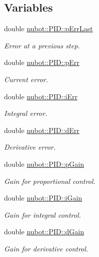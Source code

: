 \subsection*{Variables}
\begin{DoxyCompactItemize}
\item 
double \hyperlink{group__gazebo__common_gab22052153953c1a8b5eee63ab415fa2a}{nubot\-::\-P\-I\-D\-::p\-Err\-Last}
\begin{DoxyCompactList}\small\item\em Error at a previous step. \end{DoxyCompactList}\item 
double \hyperlink{group__gazebo__common_ga3b4084ff47368c23428b95c2fa6d78ee}{nubot\-::\-P\-I\-D\-::p\-Err}
\begin{DoxyCompactList}\small\item\em Current error. \end{DoxyCompactList}\item 
double \hyperlink{group__gazebo__common_gabed7f1c0d6b47c154c5b8733d5c043ef}{nubot\-::\-P\-I\-D\-::i\-Err}
\begin{DoxyCompactList}\small\item\em Integral error. \end{DoxyCompactList}\item 
double \hyperlink{group__gazebo__common_gaa8ebb6b2cec73c281d83ac6882739320}{nubot\-::\-P\-I\-D\-::d\-Err}
\begin{DoxyCompactList}\small\item\em Derivative error. \end{DoxyCompactList}\item 
double \hyperlink{group__gazebo__common_ga515d0b570daa43350349e1b776860a58}{nubot\-::\-P\-I\-D\-::p\-Gain}
\begin{DoxyCompactList}\small\item\em Gain for proportional control. \end{DoxyCompactList}\item 
double \hyperlink{group__gazebo__common_gac7b246ff55dc55bf825432fa362af235}{nubot\-::\-P\-I\-D\-::i\-Gain}
\begin{DoxyCompactList}\small\item\em Gain for integral control. \end{DoxyCompactList}\item 
double \hyperlink{group__gazebo__common_ga4e2f4ef996f5fd9628686b5111e3d0d3}{nubot\-::\-P\-I\-D\-::d\-Gain}
\begin{DoxyCompactList}\small\item\em Gain for derivative control. \end{DoxyCompactList}\item 

\end{DoxyCompactItemize}
